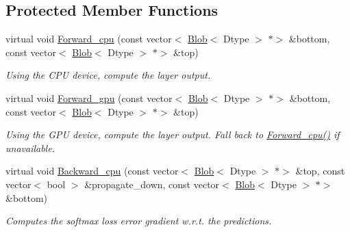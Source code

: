 \subsection*{Protected Member Functions}
\begin{DoxyCompactItemize}
\item 
\mbox{\label{classcaffe_1_1_softmax_with_loss_layer_a093493e6f87ee7a411e4c468b5fa9f9c}} 
virtual void \mbox{\hyperlink{classcaffe_1_1_softmax_with_loss_layer_a093493e6f87ee7a411e4c468b5fa9f9c}{Forward\+\_\+cpu}} (const vector$<$ \mbox{\hyperlink{classcaffe_1_1_blob}{Blob}}$<$ Dtype $>$ $\ast$$>$ \&bottom, const vector$<$ \mbox{\hyperlink{classcaffe_1_1_blob}{Blob}}$<$ Dtype $>$ $\ast$$>$ \&top)
\begin{DoxyCompactList}\small\item\em Using the C\+PU device, compute the layer output. \end{DoxyCompactList}\item 
\mbox{\label{classcaffe_1_1_softmax_with_loss_layer_a558fbaaf863070caac03c7566aefdf11}} 
virtual void \mbox{\hyperlink{classcaffe_1_1_softmax_with_loss_layer_a558fbaaf863070caac03c7566aefdf11}{Forward\+\_\+gpu}} (const vector$<$ \mbox{\hyperlink{classcaffe_1_1_blob}{Blob}}$<$ Dtype $>$ $\ast$$>$ \&bottom, const vector$<$ \mbox{\hyperlink{classcaffe_1_1_blob}{Blob}}$<$ Dtype $>$ $\ast$$>$ \&top)
\begin{DoxyCompactList}\small\item\em Using the G\+PU device, compute the layer output. Fall back to \mbox{\hyperlink{classcaffe_1_1_softmax_with_loss_layer_a093493e6f87ee7a411e4c468b5fa9f9c}{Forward\+\_\+cpu()}} if unavailable. \end{DoxyCompactList}\item 
virtual void \mbox{\hyperlink{classcaffe_1_1_softmax_with_loss_layer_a39d8b7d59f2c951ac2573827f181284f}{Backward\+\_\+cpu}} (const vector$<$ \mbox{\hyperlink{classcaffe_1_1_blob}{Blob}}$<$ Dtype $>$ $\ast$$>$ \&top, const vector$<$ bool $>$ \&propagate\+\_\+down, const vector$<$ \mbox{\hyperlink{classcaffe_1_1_blob}{Blob}}$<$ Dtype $>$ $\ast$$>$ \&bottom)
\begin{DoxyCompactList}\small\item\em Computes the softmax loss error gradient w.\+r.\+t. the predictions. \end{DoxyCompactList}\item 

\end{DoxyCompactItemize}
